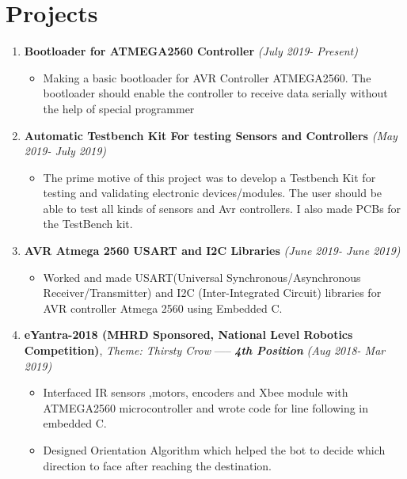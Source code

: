 \documentclass[10pt,a4paper,sans]{moderncv} %
\begin{document}

\section{Projects}


\begin{enumerate}

\item \textbf{ Bootloader for ATMEGA2560 Controller} \textit{ (July 2019- Present) }
\begin{itemize}
\item Making a basic bootloader for AVR Controller ATMEGA2560. The bootloader should enable the controller to receive data serially without the help of special programmer
\newline
\end{itemize}

\item \textbf{ Automatic Testbench Kit For testing Sensors and Controllers} \textit{ (May 2019- July 2019) }
\begin{itemize}
\item The prime motive of this project was to develop a Testbench Kit for testing and validating electronic devices/modules. The user should be able to test all kinds of sensors and Avr controllers. I also made PCBs for the TestBench kit.
\newline
\end{itemize}

\item \textbf{ AVR Atmega 2560 USART and I2C Libraries} \textit{ (June 2019- June 2019) }
\begin{itemize}
\item Worked and made USART(Universal Synchronous/Asynchronous Receiver/Transmitter) and I2C (Inter-Integrated Circuit) libraries for AVR controller Atmega 2560 using Embedded C.
\newline
\end{itemize}

\item \textbf{eYantra-2018 (MHRD Sponsored, National Level Robotics Competition)}, \newline\textit{Theme: Thirsty Crow }  ----- \textbf{\textit{4th Position}}       \textit{ (Aug 2018- Mar 2019) }
\begin{itemize}
\item Interfaced IR sensors ,motors, encoders and Xbee module with ATMEGA2560 microcontroller and wrote code for line following in embedded C.
\item Designed Orientation Algorithm which helped the bot to decide which direction to face after reaching the destination.
\newline
\end{itemize}


\end{enumerate}
\end{document}
